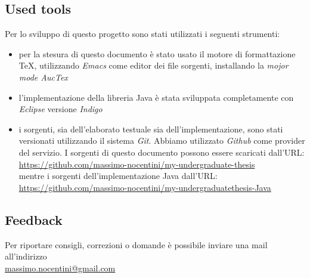 \subsection{Used tools}
Per lo sviluppo di questo progetto sono stati utilizzati i seguenti
strumenti:
\begin{itemize}
\item per la stesura di questo documento \`e stato usato il motore di
  formattazione \TeX, utilizzando \emph{Emacs} come editor dei file
  sorgenti, installando la \emph{mojor mode AucTex}
\item l'implementazione della libreria Java \`e stata sviluppata
  completamente con \emph{Eclipse} versione \emph{Indigo}
\item i sorgenti, sia dell'elaborato testuale sia
  dell'implementazione, sono stati versionati utilizzando il sistema
  \emph{Git}. Abbiamo utilizzato \emph{Github} come provider del
  servizio. I sorgenti di questo documento possono essere scaricati
  dall'URL:\\
  \href{https://github.com/massimo-nocentini/my-undergraduate-thesis}{
    https://github.com/massimo-nocentini/my-undergraduate-thesis}\\
  mentre i sorgenti dell'implementazione Java dall'URL:\\
  \href{https://github.com/massimo-nocentini/my-undergraduatethesis-Java}{
    https://github.com/massimo-nocentini/my-undergraduatethesis-Java}
\end{itemize}

\subsection{Feedback}
Per riportare consigli, correzioni o domande \`e possibile inviare una
mail all'indirizzo \\
\href{massimo.nocentini@gmail.com}{massimo.nocentini@gmail.com}
